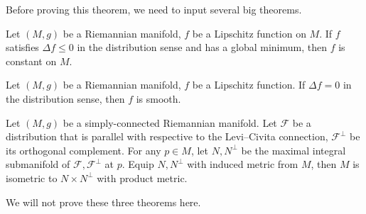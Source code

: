 Before proving this theorem, we need to input several big theorems.

\begin{thm}
    Let $(M,g)$ be a Riemannian manifold, $f$ be a Lipschitz function on $M$.
    If $f$ satisfies $\Delta f\leq 0$ in the distribution sense and has a global minimum, then $f$ is constant on $M$.
\end{thm}

\begin{thm}
    Let $(M,g)$ be a Riemannian manifold, $f$ be a Lipschitz function.
    If $\Delta f=0$ in the distribution sense, then $f$ is smooth.
\end{thm}

\begin{thm}
    Let $(M,g)$ be a simply-connected Riemannian manifold.
    Let $\mathcal{F}$ be a distribution that is parallel with respective to the Levi--Civita connection, $\mathcal{F}^\perp$ be its orthogonal complement.
    For any $p\in M$, let $N,N^\perp$ be the maximal integral submanifold of $\mathcal{F},\mathcal{F}^\perp$ at $p$.
    Equip $N,N^\perp$ with induced metric from $M$, then $M$ is isometric to $N\times N^\perp$ with product metric.
\end{thm}

We will not prove these three theorems here.

